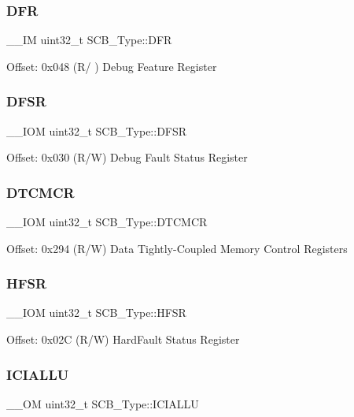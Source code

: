 \subsubsection{\texorpdfstring{DFR}{DFR}}
{\footnotesize\ttfamily \+\_\+\+\_\+\+IM uint32\+\_\+t S\+C\+B\+\_\+\+Type\+::\+D\+FR}

Offset\+: 0x048 (R/ ) Debug Feature Register \mbox{\label{struct_s_c_b___type_a191579bde0d21ff51d30a714fd887033}} 
\subsubsection{\texorpdfstring{DFSR}{DFSR}}
{\footnotesize\ttfamily \+\_\+\+\_\+\+I\+OM uint32\+\_\+t S\+C\+B\+\_\+\+Type\+::\+D\+F\+SR}

Offset\+: 0x030 (R/W) Debug Fault Status Register \mbox{\label{struct_s_c_b___type_a2836e932734240076ce91cf4484cdf43}} 
\subsubsection{\texorpdfstring{DTCMCR}{DTCMCR}}
{\footnotesize\ttfamily \+\_\+\+\_\+\+I\+OM uint32\+\_\+t S\+C\+B\+\_\+\+Type\+::\+D\+T\+C\+M\+CR}

Offset\+: 0x294 (R/W) Data Tightly-\/\+Coupled Memory Control Registers \mbox{\label{struct_s_c_b___type_a14ad254659362b9752c69afe3fd80934}} 
\subsubsection{\texorpdfstring{HFSR}{HFSR}}
{\footnotesize\ttfamily \+\_\+\+\_\+\+I\+OM uint32\+\_\+t S\+C\+B\+\_\+\+Type\+::\+H\+F\+SR}

Offset\+: 0x02C (R/W) Hard\+Fault Status Register \mbox{\label{struct_s_c_b___type_a573260e7836dbc43707df97dd475a0c8}} 
\subsubsection{\texorpdfstring{ICIALLU}{ICIALLU}}
{\footnotesize\ttfamily \+\_\+\+\_\+\+OM uint32\+\_\+t S\+C\+B\+\_\+\+Type\+::\+I\+C\+I\+A\+L\+LU}

